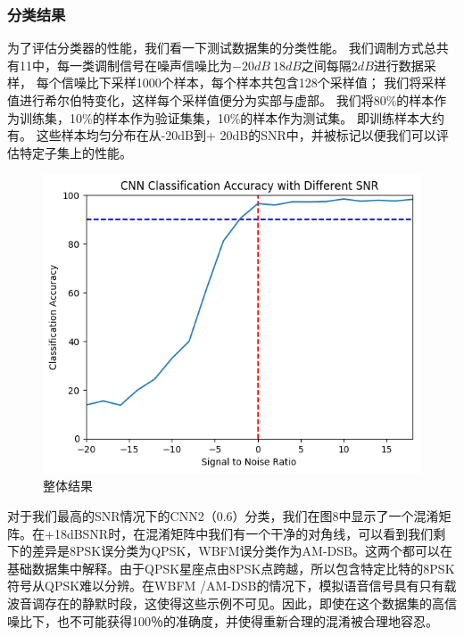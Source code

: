 \subsubsection{分类结果}
为了评估分类器的性能，我们看一下测试数据集的分类性能。
我们调制方式总共有11中，每一类调制信号在噪声信噪比为$-20dB~18dB$之间每隔$2dB$进行数据采样，
每个信噪比下采样1000个样本，每个样本共包含128个采样值；
我们将采样值进行希尔伯特变化，这样每个采样值便分为实部与虚部。
我们将80\%的样本作为训练集，10\%的样本作为验证集集，10\%的样本作为测试集。
即训练样本大约有。 这些样本均匀分布在从-20dB到+ 20dB的SNR中，并被标记以便我们可以评估特定子集上的性能。\par
\begin{figure}[!h]
	\centering
	\includegraphics[scale=0.6]{figures/chapter_3/fig_3_9}
	\caption{整体结果}	\label{sec:fig_3_9}
\end{figure}
对于我们最高的SNR情况下的CNN2（0.6）分类，我们在图8中显示了一个混淆矩阵。在+18dBSNR时，在混淆矩阵中我们有一个干净的对角线，可以看到我们剩下的差异是8PSK误分类为QPSK，WBFM误分类作为AM-DSB。这两个都可以在基础数据集中解释。由于QPSK星座点由8PSK点跨越，所以包含特定比特的8PSK符号从QPSK难以分辨。在WBFM /AM-DSB的情况下，模拟语音信号具有只有载波音调存在的静默时段，这使得这些示例不可见。因此，即使在这个数据集的高信噪比下，也不可能获得100％的准确度，并使得重新合理的混淆被合理地容忍。\par
